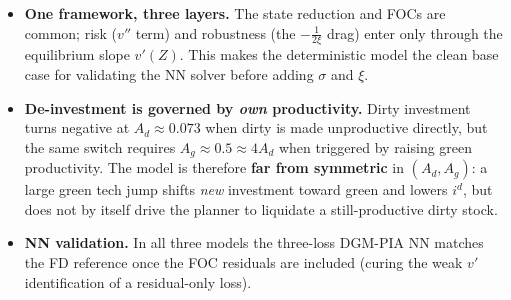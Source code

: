\documentclass{article}
\begin{document}
\begin{itemize}
\item \textbf{One framework, three layers.} The state reduction and FOCs are common; risk
($v''$ term) and robustness (the $-\tfrac{1}{2\xi}$ drag) enter only through the
equilibrium slope $v'(Z)$. This makes the deterministic model the clean base
case for validating the NN solver before adding $\sigma$ and $\xi$.
\item \textbf{De-investment is governed by \textit{own} productivity.} Dirty investment turns
negative at $A_d\approx0.073$ when dirty is made unproductive directly, but the
same switch requires $A_g\approx0.5\approx4A_d$ when triggered by raising green
productivity. The model is therefore \textbf{far from symmetric} in $(A_d,A_g)$: a
large green tech jump shifts \textit{new} investment toward green and lowers $i^d$, but
does not by itself drive the planner to liquidate a still-productive dirty stock.
\item \textbf{NN validation.} In all three models the three-loss DGM-PIA NN matches the FD
reference once the FOC residuals are included (curing the weak $v'$ identification
of a residual-only loss).
\end{itemize}
\end{document}

